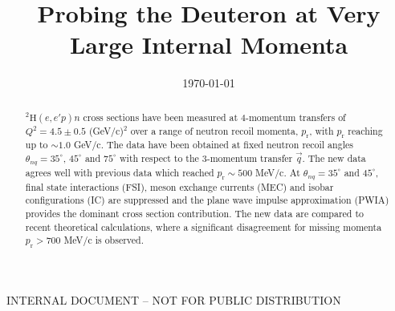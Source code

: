 \documentclass[aps,prl,twocolumn,showpacs,superscriptaddress,groupedaddress]{revtex4-2}  %
\begin{document}
\widetext
{}
\centerline{INTERNAL DOCUMENT -- NOT FOR PUBLIC DISTRIBUTION}


\title{Probing the Deuteron at Very Large Internal Momenta}



\date{\today}


\begin{abstract}
  $^{2}\mathrm{H}(e,e'p)n$ cross sections have been measured at 4-momentum transfers of $Q^{2} = 4.5 \pm 0.5$ (GeV/c)$^{2}$
  over a range of neutron recoil momenta, $p_{\mathrm{r}}$, with $p_{\mathrm{r}}$ reaching up to $\sim1.0$ GeV/c. The data have
  been obtained at fixed neutron recoil angles $\theta_{nq} = 35^\circ$, $45^\circ$ and $75^{\circ}$  with respect to the 3-momentum
  transfer $\vec q$. The new data agrees well with previous data which reached $p_{\mathrm{r}}\sim500$ MeV/c. At $\theta_{nq} = 35^\circ$
  and $45^\circ$, final state interactions (FSI), meson exchange currents (MEC) and isobar configurations (IC) are suppressed and
  the plane wave impulse approximation (PWIA) provides the dominant cross section contribution. The new data are compared to recent
  theoretical calculations, where a significant disagreement for missing momenta $p_{\mathrm{r}}>700$ MeV/c is observed. 
\end{abstract}

\pacs{}
\maketitle

\end{document}
